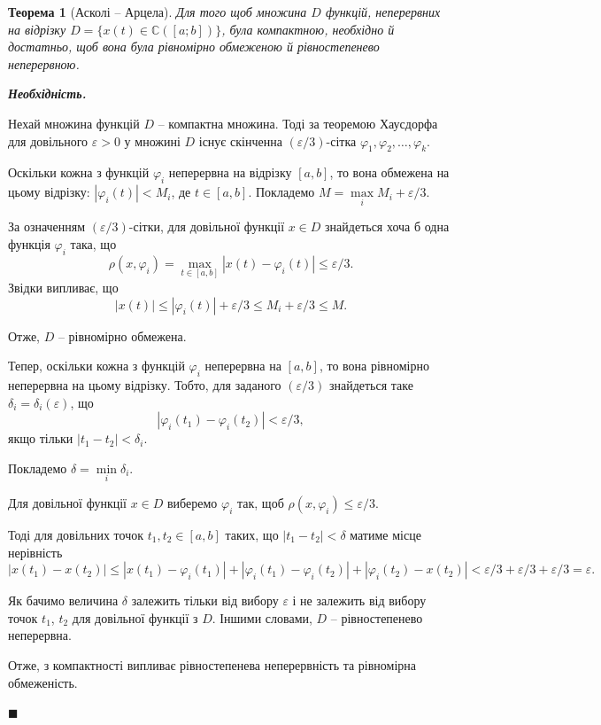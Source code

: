 \documentclass[14pt,twoside]{extreport}
\theoremstyle{mystyle}
\newtheorem{thm}{Теорема}
\renewenvironment{proof}{{\bfseries Доведення.}}{$\blacksquare$}
\numberwithin{equation}{chapter}
\newcommand{\cab}{\mathbb{C}([a; b])}
\begin{document}
\begin{thm}[Асколі -- Арцела]
Для того щоб множина $D$ функцій, неперервних на відрізку $D=\{x(t) \in \cab\}$, була компактною, необхідно й достатньо, щоб вона була рівномірно обмеженою й рівностепенево неперервною.
\end{thm}

\begin{proof}

\emph{\textbf{Необхідність.}}

Нехай множина функцій $D$ -- компактна множина. Тоді за теоремою Хаусдорфа для довільного $\varepsilon>0$ у множині $D$ існує скінченна $(\varepsilon/3)$-сітка $\varphi_1, \varphi_2,\ldots,\varphi_k$.

Оскільки кожна з функцій $\varphi_i$ неперервна на відрізку $[a,b]$, то вона обмежена на цьому відрізку: $|\varphi_i(t)|<M_i$, де $t\in[a,b]$. Покладемо $M=\max\limits_{i} M_i+\varepsilon/3$.

За означенням $(\varepsilon/3)$-сітки, для довільної функції $x\in D$ знайдеться хоча б одна функція $\varphi_i$ така, що
\[\rho(x,\varphi_i)=\max\limits_{t\in[a,b]}|x(t)-\varphi_i(t)|\leqslant\varepsilon/3.\]
Звідки випливає, що
\[|x(t)|\leqslant|\varphi_i(t)|+\varepsilon/3\leqslant M_i+\varepsilon/3\leqslant M.\]

Отже, $D$ -- рівномірно обмежена.

Тепер, оскільки кожна з функцій $\varphi_i$ неперервна на $[a,b]$, то вона рівномірно неперервна на цьому відрізку. Тобто, для заданого $(\varepsilon/3)$ знайдеться таке $\delta_i=\delta_i(\varepsilon)$, що \[|\varphi_i(t_1)-\varphi_i(t_2)|<\varepsilon/3,\]
якщо тільки $|t_1 - t_2|<\delta_i$.

Покладемо $\delta=\min\limits_{i}\delta_i$.

Для довільної функції $x\in D$ виберемо $\varphi_i$ так, щоб $\rho(x,\varphi_i)\leqslant\varepsilon/3$.

Тоді для довільних точок $t_1, t_2\in[a,b]$ таких, що $|t_1-t_2|<\delta$ матиме місце нерівність
\[|x(t_1)-x(t_2)|\leqslant |x(t_1)-\varphi_i(t_1)|+|\varphi_i(t_1)-\varphi_i(t_2)|+|\varphi_i(t_2)-x(t_2)|<\varepsilon/3+\varepsilon/3+\varepsilon/3=\varepsilon.\]

Як бачимо величина $\delta$ залежить тільки від вибору $\varepsilon$ і не залежить від вибору точок $t_1$, $t_2$ для довільної функції з $D$. Іншими словами, $D$ -- рівностепенево неперервна.

Отже, з компактності випливає рівностепенева неперервність та рівномірна обмеженість.


\end{proof}
\end{document}
